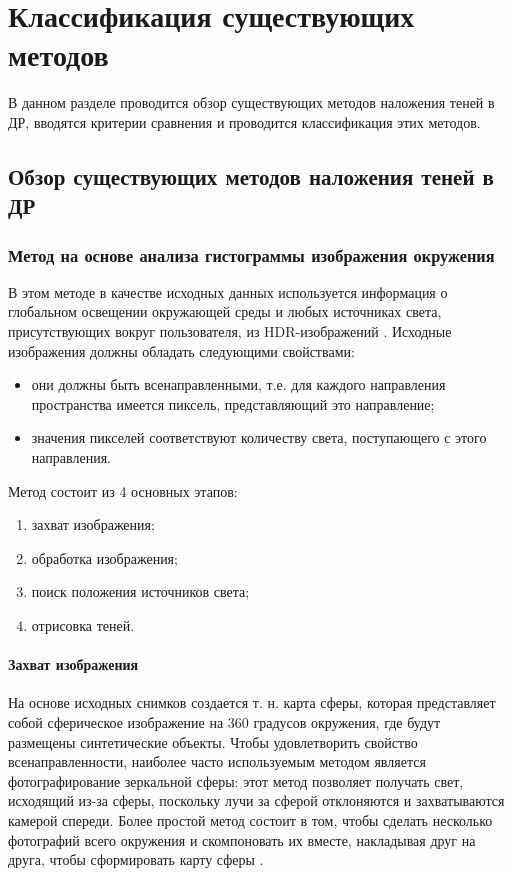 \chapter{Классификация существующих методов}

В данном разделе проводится обзор существующих методов наложения теней в ДР, вводятся критерии сравнения и проводится классификация этих методов.

\section{Обзор существующих методов наложения теней в ДР}

\subsection{Метод на основе анализа гистограммы изображения окружения}

В этом методе в качестве исходных данных используется информация о глобальном освещении окружающей среды и любых источниках света, присутствующих вокруг пользователя, из HDR-изображений \cite{osti2019real}. Исходные изображения должны обладать следующими свойствами:

\begin{itemize}
	\item они должны быть всенаправленными, т.е. для каждого направления пространства имеется пиксель, представляющий это направление;
	\item значения пикселей соответствуют количеству света, поступающего с этого направления.
\end{itemize}

Метод состоит из 4 основных этапов:

\begin{enumerate}
	\item захват изображения;
	\item обработка изображения;
	\item поиск положения источников света;
	\item отрисовка теней.
\end{enumerate}

\subsubsection*{Захват изображения}

На основе исходных снимков создается т. н. карта сферы, которая представляет собой сферическое изображение на 360 градусов окружения, где будут размещены синтетические объекты. Чтобы удовлетворить свойство всенаправленности, наиболее часто используемым методом является фотографирование зеркальной сферы: этот метод позволяет получать свет, исходящий из-за сферы, поскольку лучи за сферой отклоняются и захватываются камерой спереди. Более простой метод состоит в том, чтобы сделать несколько фотографий всего окружения и скомпоновать их вместе, накладывая друг на друга, чтобы сформировать карту сферы \cite{osti2019real}.

